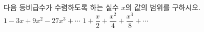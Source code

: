 다음 등비급수가 수렴하도록 하는 실수 $x$의 값의 범위를 구하시오.
 $1-3x+9x^{2}-27x^{3}+\cdots$
 $1+\dfrac{x}{2}+\dfrac{x^{2}}{4}+\dfrac{x^{3}}{8}+\cdots$
